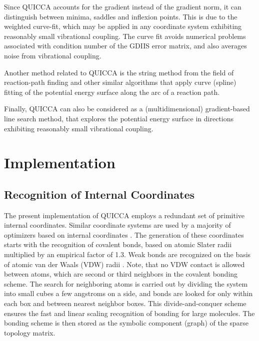 \documentclass[prl,aps,preprint,superbib,12pt]{revtex4}
\begin{document}
Since QUICCA accounts
for the gradient instead of the gradient norm, it can  distinguish between 
minima, saddles and inflexion points.  This is due to the weighted curve-fit, which may  
be applied in any coordinate system exhibiting reasonably small vibrational coupling. 
The curve fit avoids numerical problems associated with condition number
of the GDIIS error matrix, and also averages noise from vibrational coupling.

Another method related to QUICCA is the string method from the
field of reaction-path finding \cite{EWeinan02,BPeters04}
and other similar algorithms \cite{CGonzalez90} that
apply curve (spline) fitting of the potential energy surface 
along the arc of a reaction path. 

Finally, QUICCA can also be considered as a (multidimensional) gradient-based line search method, that explores the potential energy surface in directions
exhibiting reasonably small vibrational coupling.

\section{Implementation}\label{implementation}

\subsection{Recognition of Internal Coordinates} \label{recognition}

The present implementation of QUICCA employs a redundant set of primitive internal 
coordinates. Similar coordinate systems are used by a majority of optimizers based on internal coordinates 
\cite{GFogarasi79,GFogarasi92,FEckert97,JBaker93,HSchlegel98}.  
The generation of these coordinates starts with the recognition of covalent bonds, 
based on atomic Slater radii \cite{JSlater64}  multiplied by an empirical factor of 1.3. 
Weak bonds are recognized on the basis of atomic van der Waals (VDW) radii \cite{webelements}.
Note, that no VDW contact is allowed between atoms, which are second or third neighbors in the 
covalent bonding scheme.  The search for neighboring atoms is carried out by dividing 
the system into small cubes a few angstroms on a side, and bonds are looked for only within 
each box and between nearest neighbor boxes.  This divide-and-conquer scheme ensures the fast 
and linear scaling recognition of bonding for large molecules.   The bonding scheme is then 
stored as the symbolic component (graph) of the sparse topology matrix.
\end{document}
